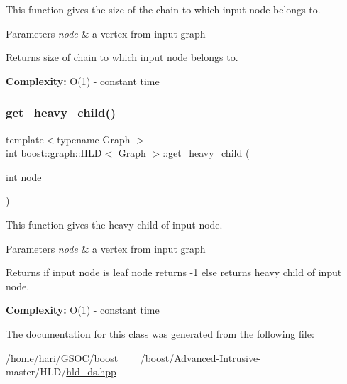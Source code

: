 \begin{DoxyItemize}
\item This function gives the size of the chain to which input node belongs to.  
\end{DoxyItemize}
\begin{DoxyParams}{Parameters}
{\em node} & a vertex from input graph \\
\hline
\end{DoxyParams}
\begin{DoxyReturn}{Returns}
size of chain to which input node belongs to. 
\end{DoxyReturn}


{\bfseries  Complexity\+: } O(1) -\/ constant time \mbox{\label{classboost_1_1graph_1_1HLD_a174ef9cc45868ae35ed21e83795b3001}} 
\subsubsection{\texorpdfstring{get\+\_\+heavy\+\_\+child()}{get\_heavy\_child()}}
{\footnotesize\ttfamily template$<$typename Graph $>$ \\
int \hyperlink{classboost_1_1graph_1_1HLD}{boost\+::graph\+::\+H\+LD}$<$ Graph $>$\+::get\+\_\+heavy\+\_\+child (\begin{DoxyParamCaption}\item[{int}]{node }\end{DoxyParamCaption})\hspace{0.3cm}{\ttfamily [inline]}}


\begin{DoxyItemize}
\item This function gives the heavy child of input node.  
\end{DoxyItemize}
\begin{DoxyParams}{Parameters}
{\em node} & a vertex from input graph \\
\hline
\end{DoxyParams}
\begin{DoxyReturn}{Returns}
if input node is leaf node returns -\/1 else returns heavy child of input node. 
\end{DoxyReturn}


{\bfseries  Complexity\+: } O(1) -\/ constant time 

The documentation for this class was generated from the following file\+:\begin{DoxyCompactItemize}
\item 
/home/hari/\+G\+S\+O\+C/boost\+\_\+\_\+\_/boost/\+Advanced-\/\+Intrusive-\/master/\+H\+L\+D/\hyperlink{hld__ds_8hpp}{hld\+\_\+ds.\+hpp}\end{DoxyCompactItemize}
